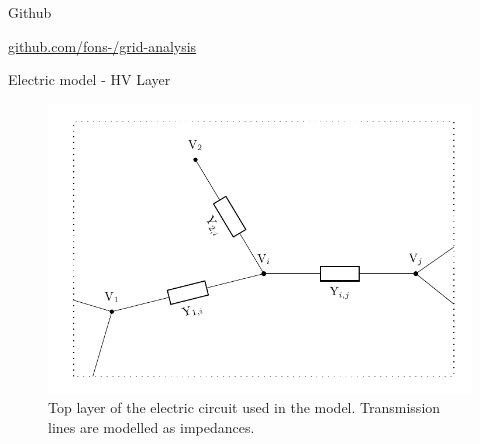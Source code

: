 \documentclass[10pt]{beamer}
\begin{document}
{
\begin{frame}[plain]
\end{frame}
}

\begin{frame}{Github}
  \begin{center}\href{https://github.com/fons-/grid-analysis}{github.com/fons-/grid-analysis}\end{center}
\end{frame}


\begin{frame}{Electric model - HV Layer}
  \begin{figure}
      \centering
      \includegraphics[width=.8\textwidth]{img/vettegraaftoplayer.pdf}
      \caption{Top layer of the electric circuit used in the model. Transmission lines are modelled as impedances.}
      \label{fig:my_label}
  \end{figure}
\end{frame}
\end{document}
